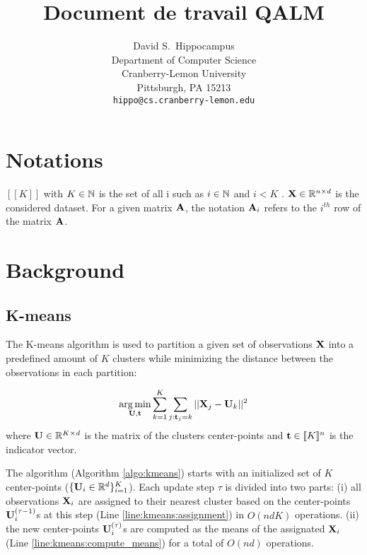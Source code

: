 \documentclass{article}
\title{Document de travail QALM}
\author{%
  David S.~Hippocampus \\
  Department of Computer Science\\
  Cranberry-Lemon University\\
  Pittsburgh, PA 15213 \\
  \texttt{hippo@cs.cranberry-lemon.edu} \\
}
\begin{document}
\maketitle

\section{Notations}

$[\![K]\!]$ with $K \in {\mathbb{N}}$ is the set of all i such as $i \in {\mathbb{N}}$ and $i < K$ . ${\mathbf{X}} \in \mathbb{R}^{n \times d}$ is the considered dataset. For a given matrix ${\mathbf{A}}$, the notation ${\mathbf{A}}_i$ refers to the $i^{th}$ row of the matrix ${\mathbf{A}}$.

\section{Background}

\subsection{K-means}

The K-means algorithm is used to partition a given set of observations ${\mathbf{X}}$ into a predefined amount of $K$ clusters while minimizing the distance between the observations in each partition:

\begin{equation}
\label{eq:kmean_problem}
    \operatorname*{arg\,min}_{{\mathbf{U}}, {\mathbf{t}}} \sum_{k=1}^{K} \sum_{j: {\mathbf{t}}_j = k} ||{\mathbf{X}}_j -{\mathbf{U}}_k||^2 \\
\end{equation}
where ${\mathbf{U}} \in \mathbb{R}^{K \times d}$ is the matrix of the clusters center-points and ${\mathbf{t}} \in  [\![K]\!]^n$ is the indicator vector.

The algorithm (Algorithm \ref{algo:kmeans}) starts with an initialized set of $K$ center-points ($\{{\mathbf{U}}_i \in \mathbb{R}^d\}_{i=1}^{K}$). Each update step $\tau$ is divided into two parts: (i) all observations ${\mathbf{X}}_i$ are assigned to their nearest cluster based on the center-points ${\mathbf{U}}_i^{(\tau-1)}$s at this step (Line \ref{line:kmeans:assignment}) in $O(ndK)$ operations. (ii) the new center-points ${\mathbf{U}}_i^{(\tau)}$s are computed as the means of the assignated ${\mathbf{X}}_i$ (Line \ref{line:kmeans:compute_means}) for a total of $O(nd)$ operations.
\end{document}
